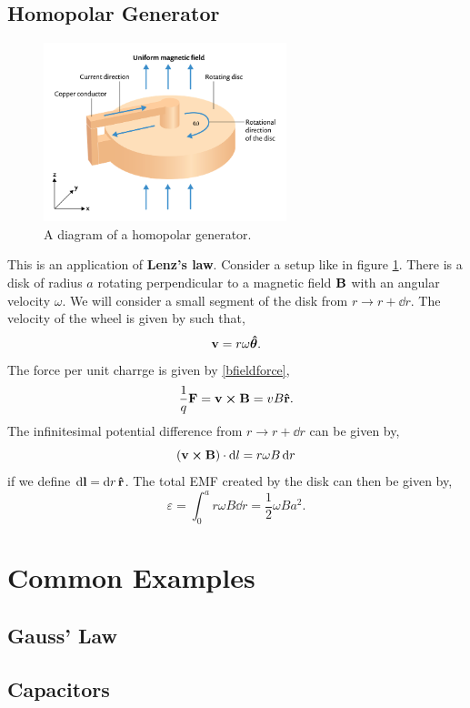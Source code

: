 \documentclass{book}
\begin{document}
\section{Homopolar Generator}
\begin{figure}
    \centering
    \includegraphics[width=200pt]{homopolar-generator-schematic.png}
    \caption{A diagram of a homopolar generator.}
    \label{fig:homopolar}
\end{figure}
This is an application of \textbf{Lenz's law}. Consider a setup like in figure \ref{fig:homopolar}. There is a disk of radius $a$ rotating perpendicular to a magnetic field $\vb{B}$ with an angular velocity $\omega$. We will consider a small segment of the disk from $r \to r + \dd{r}$. The velocity of the wheel is given by such that,
\begin{equation}
    \vb{v} = r\omega\vu*{\theta}.
\end{equation}
The force per unit charrge is given by \eqref{bfieldforce},
\begin{equation}
    \frac{1}{q}\vb{F} = \vb{v} \cross \vb{B} = vB\vu{r}.
\end{equation}
The infinitesimal potential difference from $r \to r + \dd{r}$ can be given by,
\begin{equation}
    (\vb{v}\cross\vb{B})\cdot\dd{l} = r\omega B\dd{r} 
\end{equation}
if we define $\dd{\vb{l}} = \dd{r}\vu{r}$. The total EMF created by the disk can then be given by,
\begin{equation}
    \varepsilon = \int_0^ar\omega B \dd{r} = \frac{1}{2}\omega B a^2.
\end{equation}
\chapter{Common Examples}
\section{Gauss' Law}
\section{Capacitors}
\end{document}
